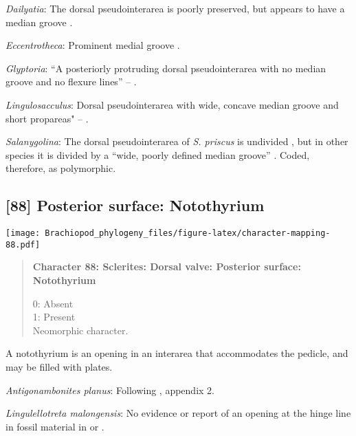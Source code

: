 \documentclass[openany]{book}
\theoremstyle{definition}
\theoremstyle{definition}
\theoremstyle{definition}
\theoremstyle{remark}
\begin{document}
\hypertarget{Dailyatia-coding-87}{}
\emph{Dailyatia}: The dorsal pseudointerarea is poorly preserved, but
appears to have a median groove \citep{Holmer2006Aspinose}.

\hypertarget{Eccentrotheca-coding-87}{}
\emph{Eccentrotheca}: Prominent medial groove
\citep{Balthasar2009Thebrachiopod}.

\hypertarget{Glyptoria-coding-87}{}
\emph{Glyptoria}: ``A posteriorly protruding dorsal pseudointerarea with
no median groove and no flexure lines'' --
\citet{Chen2007Reinterpretationof}.

\hypertarget{Lingulosacculus-coding-87}{}
\emph{Lingulosacculus}: Dorsal pseudointerarea with wide, concave median
groove and short propareas" --
\citet{Williams2000LinguliformeaCraniiformea}.

\hypertarget{Salanygolina-coding-87}{}
\emph{Salanygolina}: The dorsal pseudointerarea of \emph{S. priscus} is
undivided \citep{Popov2009Earlyontogeny}, but in other species it is
divided by a ``wide, poorly defined median groove''
\citep{Williams2000LinguliformeaCraniiformea}. Coded, therefore, as
polymorphic.

\subsection*{{[}88{]} Posterior surface:
Notothyrium}\label{posterior-surface-notothyrium}

\texttt{[image: Brachiopod\_phylogeny\_files/figure-latex/character-mapping-88.pdf]}

\begin{quote}
\textbf{Character 88: Sclerites: Dorsal valve: Posterior surface:
Notothyrium}

0: Absent\\
1: Present\\
Neomorphic character.
\end{quote}

A notothyrium is an opening in an interarea that accommodates the
pedicle, and may be filled with plates.

\hypertarget{Antigonambonites_planus-coding-88}{}
\emph{Antigonambonites planus}: Following
\citet{Williams1998Thediversity}, appendix 2.

\hypertarget{Lingulellotreta_malongensis-coding-88}{}
\emph{Lingulellotreta malongensis}: No evidence or report of an opening
at the hinge line in fossil material in \citet{Zhang2007Agregarious} or
\citet{Zhang2011Theexceptionally}.
\end{document}
